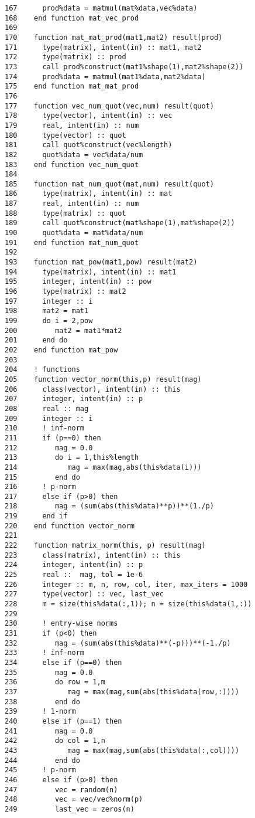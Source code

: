 \documentclass[11pt]{article}
\begin{document}
\begin{verbatim}
167      prod%data = matmul(mat%data,vec%data)
168    end function mat_vec_prod
169  
170    function mat_mat_prod(mat1,mat2) result(prod)
171      type(matrix), intent(in) :: mat1, mat2
172      type(matrix) :: prod
173      call prod%construct(mat1%shape(1),mat2%shape(2))
174      prod%data = matmul(mat1%data,mat2%data)
175    end function mat_mat_prod
176  
177    function vec_num_quot(vec,num) result(quot)
178      type(vector), intent(in) :: vec
179      real, intent(in) :: num
180      type(vector) :: quot
181      call quot%construct(vec%length)
182      quot%data = vec%data/num
183    end function vec_num_quot
184  
185    function mat_num_quot(mat,num) result(quot)
186      type(matrix), intent(in) :: mat
187      real, intent(in) :: num
188      type(matrix) :: quot
189      call quot%construct(mat%shape(1),mat%shape(2))
190      quot%data = mat%data/num
191    end function mat_num_quot
192  
193    function mat_pow(mat1,pow) result(mat2)
194      type(matrix), intent(in) :: mat1
195      integer, intent(in) :: pow
196      type(matrix) :: mat2
197      integer :: i
198      mat2 = mat1
199      do i = 2,pow
200         mat2 = mat1*mat2
201      end do
202    end function mat_pow
203  
204    ! functions
205    function vector_norm(this,p) result(mag)
206      class(vector), intent(in) :: this
207      integer, intent(in) :: p
208      real :: mag
209      integer :: i
210      ! inf-norm
211      if (p==0) then
212         mag = 0.0
213         do i = 1,this%length
214            mag = max(mag,abs(this%data(i)))
215         end do
216      ! p-norm
217      else if (p>0) then
218         mag = (sum(abs(this%data)**p))**(1./p)
219      end if
220    end function vector_norm
221  
222    function matrix_norm(this, p) result(mag)
223      class(matrix), intent(in) :: this
224      integer, intent(in) :: p
225      real ::  mag, tol = 1e-6
226      integer :: m, n, row, col, iter, max_iters = 1000
227      type(vector) :: vec, last_vec
228      m = size(this%data(:,1)); n = size(this%data(1,:))
229  
230      ! entry-wise norms
231      if (p<0) then
232         mag = (sum(abs(this%data)**(-p)))**(-1./p)
233      ! inf-norm
234      else if (p==0) then
235         mag = 0.0
236         do row = 1,m
237            mag = max(mag,sum(abs(this%data(row,:))))
238         end do
239      ! 1-norm
240      else if (p==1) then
241         mag = 0.0
242         do col = 1,n
243            mag = max(mag,sum(abs(this%data(:,col))))
244         end do
245      ! p-norm
246      else if (p>0) then
247         vec = random(n)
248         vec = vec/vec%norm(p)
249         last_vec = zeros(n)

\end{verbatim}
\end{document}

